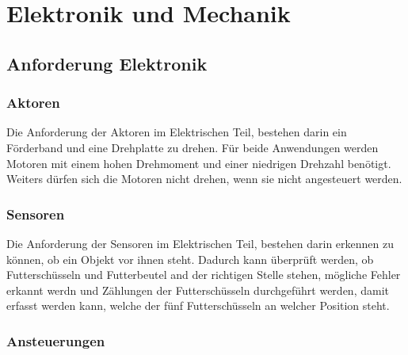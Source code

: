 \chapter{Elektronik und Mechanik}
\label{sec:elektronik-und-mechanik}

\section{Anforderung Elektronik}
\subsection{Aktoren}
Die Anforderung der Aktoren im Elektrischen Teil, bestehen darin ein Förderband und eine Drehplatte zu drehen. Für beide Anwendungen werden Motoren mit einem hohen Drehmoment und einer niedrigen Drehzahl benötigt. Weiters dürfen sich die Motoren nicht drehen, wenn sie nicht angesteuert werden.
\subsection{Sensoren}
Die Anforderung der Sensoren im Elektrischen Teil, bestehen darin erkennen zu können, ob ein Objekt vor ihnen steht. Dadurch kann überprüft werden, ob Futterschüsseln und Futterbeutel and der richtigen Stelle stehen, mögliche Fehler erkannt werdn und Zählungen der Futterschüsseln durchgeführt werden, damit erfasst werden kann, welche der fünf Futterschüsseln an welcher Position steht.
\subsection{Ansteuerungen}
